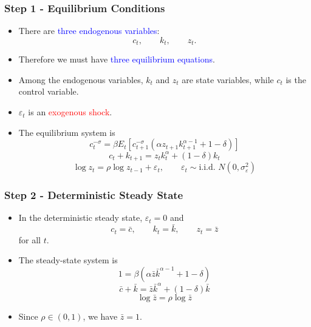 \documentclass{beamer}
\begin{document}
\begin{frame}
\frametitle{Step 1 - Equilibrium Conditions}

\begin{itemize}
\item There are \textcolor{blue}{three endogenous variables}:
\[
c_t,\qquad k_t,\qquad z_t.
\]
\item Therefore we must have \textcolor{blue}{three equilibrium equations}.
\item Among the endogenous variables, $k_t$ and $z_t$ are state variables, while $c_t$ is the control variable.
\item $\varepsilon_t$ is an \textcolor{red}{exogenous shock}.
\item The equilibrium system is
\begin{equation}\tag{EE}\label{eq:euler}
	c_t^{-\sigma} = \beta E_t\left[
	c_{t+1}^{-\sigma}\left(\alpha z_{t+1}k_{t+1}^{\alpha-1}+1-\delta\right)
	\right]
\end{equation}
\begin{equation}\tag{RC}\label{eq:rc}
c_t + k_{t+1} = z_t k_t^\alpha + (1-\delta)k_t
\end{equation}
\begin{equation}\tag{Shock}\label{eq:shock}
\log z_t = \rho \log z_{t-1} + \varepsilon_t,
\qquad
\varepsilon_t \sim \text{i.i.d. } N(0,\sigma_\varepsilon^2)
\end{equation}
\end{itemize}

\end{frame}

\begin{frame}
\frametitle{Step 2 - Deterministic Steady State}

\begin{itemize}
\item In the deterministic steady state, $\varepsilon_t=0$ and 
\[
c_t=\bar c,\qquad k_t=\bar k,\qquad z_t=\bar z
\]
for all $t$.
\item The steady-state system is
\begin{equation}\tag{EE-SS}\label{eq:euler_ss}
1 = \beta\left(\alpha \bar z \bar k^{\alpha-1} + 1-\delta\right) 
\end{equation}
\begin{equation}\tag{RC-SS}\label{eq:rc_ss}
\bar c + \bar k = \bar z \bar k^\alpha + (1-\delta)\bar k
\end{equation}
\begin{equation}\tag{Shock-SS}\label{eq:shock_ss}
\log \bar z = \rho \log \bar z
\end{equation}
\item Since $\rho \in (0,1)$, we have $\bar z = 1$.
\end{itemize}

\end{frame}
\end{document}
